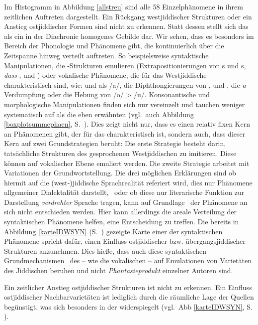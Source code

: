 Im Histogramm in Abbildung \ref{allstreu} sind alle 58 Einzelphänomene in ihrem zeitlichen Auftreten dargestellt. Ein Rückgang westjiddischer Strukturen oder ein Anstieg ostjiddischer Formen sind nicht zu erkennen. Statt dessen stellt sich das  als ein in der Diachronie homogenes Gebilde dar. Wir sehen, dass es besonders im Bereich der Phonologie und  Phänomene gibt, die kontinuierlich über die Zeitspanne hinweg verteilt auftreten. So beispielsweise syntaktische Manipulationen, die \hai{{\VO}}-Strukturen emulieren (Extrapositionierungen von \hai{{\NP}}s und \hai{{\PP}}s, \textit{dass}-, \hai{{\VR}} und \hai{{\VPR}}) oder vokalische Phänomene, die für das Westjiddische charakteristisch sind, wie:  und  als /a\textlengthmark/, die Diphthongierungen von ,  und , die \textit{a}-Verdumpfung oder die Hebung von /o/ > /u/. Konsonantische und morphologische Manipulationen finden sich nur vereinzelt und tauchen weniger systematisch auf als die eben erwähnten (vgl.\, auch Abbildung \ref{boxplotsummephaen}, S.\, \pageref{boxplotsummephaen}). Dies zeigt nicht nur, dass es einen relativ fixen Kern an Phänomenen gibt, der für das  charakteristisch ist, sondern auch, dass dieser Kern auf zwei Grundstrategien beruht: Die erste Strategie besteht darin, tatsächliche Strukturen des gesprochenen Westjiddischen zu imitieren. Diese können auf vokalischer Ebene emuliert werden. Die zweite Strategie arbeitet mit Variationen der Grundwortstellung. Die drei möglichen Erklärungen sind ob hiermit auf die (west-)jiddische Sprachrealität referiert wird, dies nur Phänomene allgemeiner Dialektalität darstellt, \,%
oder ob diese nur literarische Funktion zur Darstellung \textit{verdrehter} Sprache tragen, kann auf Grundlage \,%
 der Phänomene an sich nicht entschieden werden. Hier kann allerdings die areale Verteilung der syntaktischen Phänomene helfen, eine Entscheidung zu treffen. Die bereits in Abbildung \ref{karteIDWSYN} (S.\, \pageref{karteIDWSYN}) gezeigte Karte einer  der syntaktischen Phänomene spricht dafür, einen Einfluss ostjiddischer bzw. übergangsjiddischer \hai{{\VO}}-Strukturen anzunehmen. Dies hieße, dass auch diese syntaktischen Grundmechanismen \,%
 des  – wie die vokalischen – auf Emulationen von Varietäten des Jiddischen beruhen und nicht \textit{Phantasieprodukt} einzelner Autoren sind.

Ein zeitlicher Anstieg ostjiddischer Strukturen ist nicht zu erkennen. Ein Einfluss ostjiddischer Nachbarvarietäten ist lediglich durch die räumliche Lage der Quellen begünstigt, was sich besonders in der  widerspiegelt (vgl.\, Abb \ref{karteIDWSYN}, S.\, \pageref{karteIDWSYN}).

